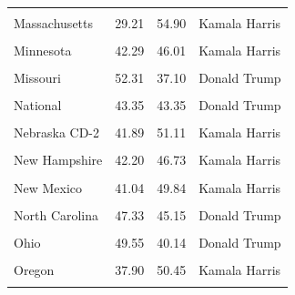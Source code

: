 \documentclass[
  letterpaper,
  DIV=11,
  numbers=noendperiod]{scrartcl}
\begin{document}
\begin{longtable}[t]{lrrl}
\cellcolor{gray!10}{Maryland} & \cellcolor{gray!10}{32.46} & \cellcolor{gray!10}{58.85} & \cellcolor{gray!10}{Kamala Harris}\\
Massachusetts & 29.21 & 54.90 & Kamala Harris\\
\addlinespace
\cellcolor{gray!10}{Michigan} & \cellcolor{gray!10}{45.87} & \cellcolor{gray!10}{44.54} & \cellcolor{gray!10}{Donald Trump}\\
Minnesota & 42.29 & 46.01 & Kamala Harris\\
\cellcolor{gray!10}{Mississippi} & \cellcolor{gray!10}{54.00} & \cellcolor{gray!10}{36.50} & \cellcolor{gray!10}{Donald Trump}\\
Missouri & 52.31 & 37.10 & Donald Trump\\
\cellcolor{gray!10}{Montana} & \cellcolor{gray!10}{54.77} & \cellcolor{gray!10}{36.51} & \cellcolor{gray!10}{Donald Trump}\\
\addlinespace
National & 43.35 & 43.35 & Donald Trump\\
\cellcolor{gray!10}{Nebraska} & \cellcolor{gray!10}{53.26} & \cellcolor{gray!10}{37.84} & \cellcolor{gray!10}{Donald Trump}\\
Nebraska CD-2 & 41.89 & 51.11 & Kamala Harris\\
\cellcolor{gray!10}{Nevada} & \cellcolor{gray!10}{46.48} & \cellcolor{gray!10}{42.45} & \cellcolor{gray!10}{Donald Trump}\\
New Hampshire & 42.20 & 46.73 & Kamala Harris\\
\addlinespace
\cellcolor{gray!10}{New Jersey} & \cellcolor{gray!10}{38.50} & \cellcolor{gray!10}{46.17} & \cellcolor{gray!10}{Kamala Harris}\\
New Mexico & 41.04 & 49.84 & Kamala Harris\\
\cellcolor{gray!10}{New York} & \cellcolor{gray!10}{36.14} & \cellcolor{gray!10}{48.21} & \cellcolor{gray!10}{Kamala Harris}\\
North Carolina & 47.33 & 45.15 & Donald Trump\\
\cellcolor{gray!10}{North Dakota} & \cellcolor{gray!10}{54.00} & \cellcolor{gray!10}{17.00} & \cellcolor{gray!10}{Donald Trump}\\
\addlinespace
Ohio & 49.55 & 40.14 & Donald Trump\\
\cellcolor{gray!10}{Oklahoma} & \cellcolor{gray!10}{58.74} & \cellcolor{gray!10}{28.15} & \cellcolor{gray!10}{Donald Trump}\\
Oregon & 37.90 & 50.45 & Kamala Harris\\
\cellcolor{gray!10}{Pennsylvania} & \cellcolor{gray!10}{45.63} & \cellcolor{gray!10}{45.24} & \cellcolor{gray!10}{Donald Trump}\\

\end{longtable}
\end{document}
